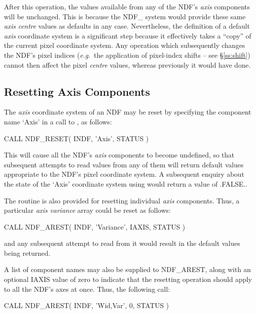 \documentclass[twoside,11pt,nolof]{starlink}
\providecommand{\st}[1]{{\emph{#1}}}
\begin{document}
After this operation, the values available from any of the NDF's
\st{axis\/} components will be unchanged.
This is because the NDF\_ system would provide these same \st{axis
centre\/} values as defaults in any case.
Nevertheless, the definition of a default \st{axis\/} coordinate system is
a significant step because it effectively takes a ``copy'' of the current
pixel coordinate system.
Any operation which subsequently changes the NDF's pixel indices
(\st{e.g.}\ the application of pixel-index shifts -- see
\S\ref{ss:shift}) cannot
then affect the pixel \st{centre\/} values, whereas previously it would
have done.

\subsection{Resetting Axis Components}

The \st{axis\/} coordinate system of an NDF may be reset by specifying the
component name `Axis' in a call to , as follows:

\small
\begin{terminalv}
      CALL NDF_RESET( INDF, 'Axis', STATUS )
\end{terminalv}
\normalsize

This will cause all the NDF's \st{axis\/} components to become undefined,
so that subsequent attempts to read values from any of them will return
default values appropriate to the NDF's pixel coordinate system.
A subsequent enquiry about the state of the `Axis' coordinate system using
 would return a value of .FALSE..

The routine  is also provided for resetting individual \st{axis\/} components.
Thus, a particular \st{axis variance\/} array could be reset as follows:

\small
\begin{terminalv}
      CALL NDF_AREST( INDF, 'Variance', IAXIS, STATUS )
\end{terminalv}
\normalsize

and any subsequent attempt to read from it would result in the default
values being returned.

A list of component names may also be supplied to NDF\_AREST, along with an
optional IAXIS value of zero to indicate that the resetting operation should
apply to all the NDF's axes at once.
Thus, the following call:

\small
\begin{terminalv}
      CALL NDF_AREST( INDF, 'Wid,Var', 0, STATUS )
\end{terminalv}
\normalsize
\end{document}
